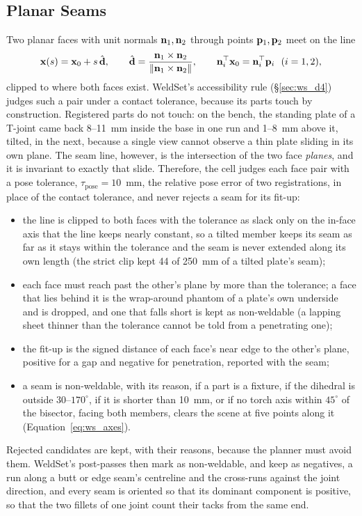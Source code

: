 \subsection{Planar Seams}
\label{sec:mc_planar}
Two planar faces with unit normals $\mathbf{n}_1,\mathbf{n}_2$ through points $\mathbf{p}_1,\mathbf{p}_2$
meet on the line
\begin{equation}
\mathbf{x}(s) = \mathbf{x}_0 + s\,\hat{\mathbf{d}},\qquad
\hat{\mathbf{d}} = \frac{\mathbf{n}_1\times\mathbf{n}_2}{\left\lVert\mathbf{n}_1\times\mathbf{n}_2\right\rVert},\qquad
\mathbf{n}_i^{\top}\mathbf{x}_0 = \mathbf{n}_i^{\top}\mathbf{p}_i\ \ (i=1,2),
\label{eq:plane_intersection}
\end{equation}
clipped to where both faces exist. WeldSet's accessibility rule (\S\ref{sec:ws_d4}) judges such a pair
under a contact tolerance, because its parts touch by construction. Registered parts do not touch: on
the bench, the standing plate of a T-joint came back 8--11~mm inside the base in one run and 1--8~mm
above it, tilted, in the next, because a single view cannot observe a thin plate sliding in its own
plane. The seam line, however, is the intersection of the two face \emph{planes}, and it is invariant
to exactly that slide. Therefore, the cell judges each face pair with a pose tolerance,
$\tau_{\mathrm{pose}}=10$~mm, the relative pose error of two registrations, in place of the contact
tolerance, and never rejects a seam for its fit-up:
\begin{itemize}
\item the line is clipped to both faces with the tolerance as slack only on the in-face axis that the
  line keeps nearly constant, so a tilted member keeps its seam as far as it stays within the tolerance
  and the seam is never extended along its own length (the strict clip kept 44 of 250~mm of a tilted
  plate's seam);
\item each face must reach past the other's plane by more than the tolerance; a face that lies behind
  it is the wrap-around phantom of a plate's own underside and is dropped, and one that falls short is
  kept as non-weldable (a lapping sheet thinner than the tolerance cannot be told from a penetrating
  one);
\item the fit-up is the signed distance of each face's near edge to the other's plane, positive for a
  gap and negative for penetration, reported with the seam;
\item a seam is non-weldable, with its reason, if a part is a fixture, if the dihedral is outside
  $30$--$170^\circ$, if it is shorter than 10~mm, or if no torch axis within $45^\circ$ of the
  bisector, facing both members, clears the scene at five points along it (Equation~\ref{eq:ws_axes}).
\end{itemize}
Rejected candidates are kept, with their reasons, because the planner must avoid them. WeldSet's
post-passes then mark as non-weldable, and keep as negatives, a run along a butt or edge seam's
centreline and the cross-runs against the joint direction, and every seam is oriented so that its dominant component is positive, so that the
two fillets of one joint count their tacks from the same end.

